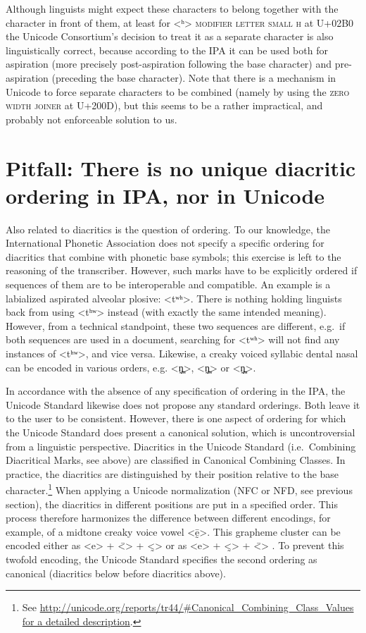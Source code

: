Although linguists might expect these characters to belong together with the
character in front of them, at least for <ʰ> \textsc{modifier letter small h} at
U+02B0 the Unicode Consortium's decision to treat it as a separate character is
also linguistically correct, because according to the IPA it can be used both
for aspiration (more precisely post-aspiration following the base character) and
pre-aspiration (preceding the base character). Note that there is a mechanism in
Unicode to force separate characters to be combined (namely by using the
\textsc{zero width joiner} at U+200D), but this seems to be a rather
impractical, and probably not enforceable solution to us.

\section{Pitfall: There is no unique diacritic ordering in IPA, nor in Unicode}
\label{pitfall-neither-the-ipa-nor-the-unicode-standard-enforce-a-unique-diacritic-ordering}

Also related to diacritics is the question of ordering. To our knowledge, the
International Phonetic Association does not specify a specific ordering for
diacritics that combine with phonetic base symbols; this exercise is left to the
reasoning of the transcriber. However, such marks have to be explicitly ordered
if sequences of them are to be interoperable and compatible. An example is a
labialized aspirated alveolar plosive: <tʷʰ>. There is nothing holding linguists
back from using <tʰʷ> instead (with exactly the same intended meaning). However,
from a technical standpoint, these two sequences are different, e.g.~if both
sequences are used in a document, searching for <tʷʰ> will not find any
instances of <tʰʷ>, and vice versa. Likewise, a creaky voiced syllabic dental
nasal can be encoded in various orders, e.g. <n̪̰̩>, <n̩̰̪> or <n̩̪̰>.

In accordance with the absence of any specification of ordering in the IPA, the
Unicode Standard likewise does not propose any standard orderings. Both leave it
to the user to be consistent. However, there is one aspect of ordering for which
the Unicode Standard does present a canonical solution, which is uncontroversial
from a linguistic perspective. Diacritics in the Unicode Standard
(i.e.~Combining Diacritical Marks, see above) are classified in Canonical
Combining Classes. In practice, the diacritics are distinguished by their
position relative to the base character.\footnote{See
\url{http://unicode.org/reports/tr44/\#Canonical\_Combining\_Class\_Values for a
detailed description}.} When applying a Unicode normalization (NFC or NFD, see
previous section), the diacritics in different positions are put in a specified
order. This process therefore harmonizes the difference between different
encodings, for example, of a midtone creaky voice vowel <ḛ̄>. This grapheme
cluster can be encoded either as <e> + <̄> + <̰> or as <e> + <̰> + <̄> . To
prevent this twofold encoding, the Unicode Standard specifies the second
ordering as canonical (diacritics below before diacritics above).

